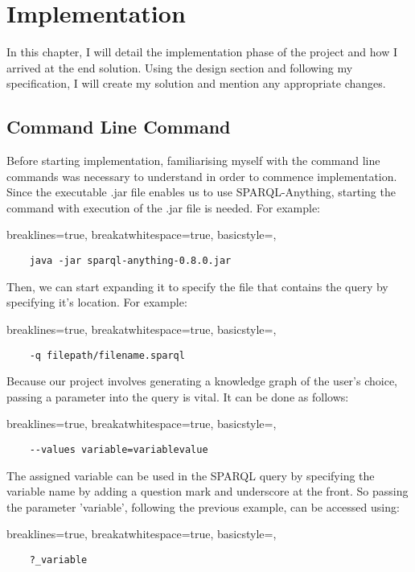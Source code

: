 \chapter{Implementation}
In this chapter, I will detail the implementation phase of the project and how I arrived at the end solution. Using the design section and following my specification, I will create my solution and mention any appropriate changes. 

\section{Command Line Command}
\hspace*{0.5cm} Before starting implementation, familiarising myself with the command line commands was necessary to understand in order to commence implementation. Since the executable .jar file enables us to use SPARQL-Anything, starting the command with execution of the .jar file is needed. For example:

\lstset
{
    breaklines=true,
    breakatwhitespace=true,
    basicstyle=\ttfamily,
}
\begin{lstlisting}
    java -jar sparql-anything-0.8.0.jar 
\end{lstlisting}

\noindent Then, we can start expanding it to specify the file that contains the query by specifying it's location. For example:

\lstset
{
    breaklines=true,
    breakatwhitespace=true,
    basicstyle=\ttfamily,
}
\begin{lstlisting}
    -q filepath/filename.sparql
\end{lstlisting}

\noindent Because our project involves generating a knowledge graph of the user's choice, passing a parameter into the query is vital. It can be done as follows: 

\lstset
{
    breaklines=true,
    breakatwhitespace=true,
    basicstyle=\ttfamily,
}
\begin{lstlisting}
    --values variable=variablevalue
\end{lstlisting}

\noindent The assigned variable can be used in the SPARQL query by specifying the variable name by adding a question mark and underscore at the front. So passing the parameter 'variable', following the previous example, can be accessed using:

\lstset
{
    breaklines=true,
    breakatwhitespace=true,
    basicstyle=\ttfamily,
}
\begin{lstlisting}
    ?_variable
\end{lstlisting}

